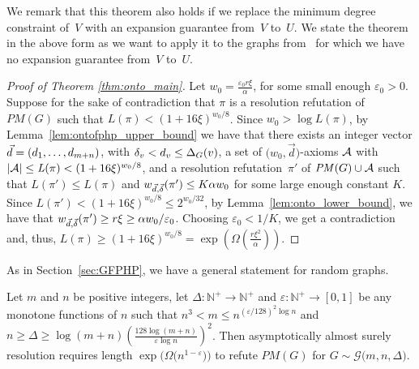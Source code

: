 \documentclass{article}
\newcommand{\BIGOMEGA}[1]{\Omega \left( #1 \right)}
\newcommand{\Nplus}     {\mathbb{N}^{+}}
\newcommand{\funcdescr}[3]{\ensuremath{ #1 : #2 \to #3}}
\newcommand{\setsize}[1]{\lvert#1\rvert}
\newcommand{\refsec}[1]{Section~\ref{#1}}
\newcommand{\reflem}[1]{Lemma~\ref{#1}}
\newcommand{\refpi}{\pi}
\newcommand{\genericformsmall}[2]{\mathit{#1}( #2 )}
\newcommand{\length}[1]{\genericformsmall{L}{#1}}
\newcommand{\width}[2][]{\genericformsmall{W_{#1}}{#2}}
\newcommand{\formulaformat}[1]{\mathit{#1}}
\newcommand{\numpigeons}{m}
\newcommand{\numholes}{n}
\newcommand{\PM}{PM(G)}
\renewcommand{\PM}{\formulaformat{PM}(G)}
\renewcommand{\deg}[2][XXXXXXXXXXXX]{\Delta_{#1}(#2)}
\newcommand{\diff}{\xi}
\newcommand{\GdegMax}{\Delta}
\newcommand{\gdegmax}{\GdegMax}
\newcommand{\Gdist}{\mathcal{G}}
\newcommand{\constonto}{128}
\newcommand{\exponentalpha}{\varepsilon}
\newcommand{\Ax}{\ensuremath\mathcal{A}}
\newcommand{\thr}[1]{ \ensuremath d_{{#1}} }
\newcommand{\vecthr}{\vec{d}}
\newcommand{\vecthrdef}[1]{\vecthr = \left(\thr{1}, \ldots, \thr{#1}\right)}
\newcommand{\adv}[1]{\delta_{{#1}}}
\newcommand{\vecadv}{\vec{\delta}}
\newcommand{\fakeaxiom}{$\bigl( w_0, \vecthr \bigr)$-axiom\xspace}
\renewcommand{\width}[1]{\ensuremath w_{\vecthr,\vecadv}( #1 )}
\numberwithin{equation}{section}
\begin{document}
We remark that this 
theorem also holds if we replace the minimum degree constraint of~$V$
with an expansion guarantee from~$V$ to~$U$.
We state the theorem
in the above form as we want to apply it to the graphs
from~\cite{GUV09Unbalanced} for which we have no expansion guarantee
from~$V$ to~$U$. 



\begin{proof}[Proof of Theorem \ref{thm:onto_main}]
  Let
  $w_0 = \frac{\varepsilon_0 r \diff}{ \alpha }$, 
  for some small enough $\varepsilon_0 > 0$. 
  Suppose for the sake of contradiction that $\refpi$ is a resolution refutation 
  of~$\PM$ such that 
  $\length{\refpi} < (1 + 16\diff)^{w_0/8}$. Since $w_0 > \log \length{\refpi}$, by \reflem{lem:ontofphp_upper_bound} we have that
  there exists 
  an integer vector $\vecthrdef{\numpigeons + \numholes}$, with 
  $\adv{v} < \thr{v} \le \deg[G]{v}$,
  a set of \fakeaxiom{s} $\Ax$
  with 
  $\setsize{\Ax} \le \length{\refpi} < (1 + 16\diff)^{w_0/8}$, 
  and a resolution refutation~$\refpi'$ of $\PM \cup \Ax$ such that 
  $\length{\refpi'} \leq \length{\refpi}$  
  and
  $\width{\refpi'} \le K{\alpha  w_0}$ for some large enough constant $K$.
  Since $\length{\refpi'} < (1 + 16\diff)^{w_0/8} \leq 2^{w_0/32}$,
  by \reflem{lem:onto_lower_bound}, we have that 
  $\width{\refpi'} \ge r \diff \ge {\alpha w_0}/{\varepsilon_0}$. 
  Choosing $\varepsilon_0 < 1/K$, we get a contradiction
  and, thus, $\length{\refpi} \geq (1 + 16\diff)^{w_0/8} = 
  \exp\left(\BIGOMEGA{\frac{r \diff^2}{\alpha}}\right)$.
\end{proof}

As in \refsec{sec:GFPHP}, we have a general statement for random graphs.

\begin{corollary}\label{cor:onto_random_main}
  Let $m$ and $n$ be positive integers, 
  let
  $\funcdescr{\gdegmax}{\Nplus}{\Nplus}$ and
  $\funcdescr{\exponentalpha}{\Nplus}{[0,1]}$ be any monotone
  functions of $n$ such that 
  $n^3 < m \le n^{\left( \exponentalpha/\constonto \right)^2 \log n}$ 
  and 
  $n \ge 
  \gdegmax \ge 
  \log (m+n) 
  \left( \frac{\constonto \log (m + n)}{\exponentalpha \log n} \right)^2$. 
  Then asymptotically almost surely resolution requires length 
  $\exp{\bigl(\Omega\bigl(n^{1-\exponentalpha}\bigr)\bigr)}$ 
  to refute $\PM$ 
  for $G \sim \Gdist \bigl(m,n,\GdegMax \bigr)$.
\end{corollary}
\end{document}

